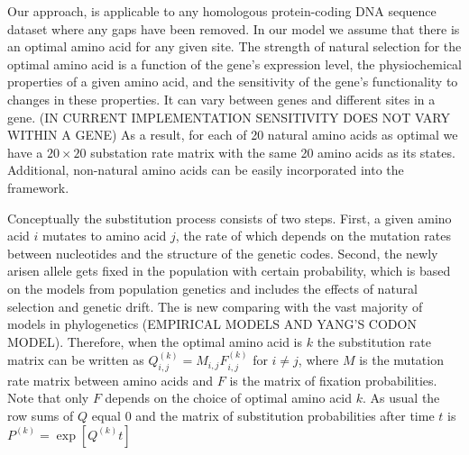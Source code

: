 \documentclass[13pt]{article}
\newcommand{\Qmat}{\ensuremath{\mathbf{Q}}\xspace}
\begin{document}
Our approach, is applicable to any homologous protein-coding DNA sequence dataset where any gaps have been removed.
In our model we assume that there is an optimal amino acid for any given site.
The strength of natural selection for the optimal amino acid is a function of the gene's expression level, the physiochemical properties of a given amino acid, and the sensitivity of the gene's functionality to changes in these properties.
It can vary between genes and different sites in a gene. (IN CURRENT IMPLEMENTATION SENSITIVITY DOES NOT VARY WITHIN A GENE)
As a result, for each of 20 natural amino acids as optimal we have a $20 \times 20$ substation rate matrix with the same 20 amino acids as its states. 
Additional, non-natural amino acids can be easily incorporated into the framework.


Conceptually the substitution process consists of two steps. 
First, a given amino acid $i$ mutates to amino acid $j$, the rate of which depends on the mutation rates between nucleotides and the structure of the genetic codes. 
Second, the newly arisen allele gets fixed in the population with certain probability, which is based on the models from population genetics and includes the effects of natural selection and genetic drift. 
The is new comparing with the vast majority of models in phylogenetics (EMPIRICAL MODELS AND YANG'S CODON MODEL).
Therefore, when the optimal amino acid is $k$ the substitution rate matrix can be written as $Q_{i,j}^{(k)}=M_{i,j}F_{i,j}^{(k)}$ for $i \ne j$, where $M$ is the mutation rate matrix between amino acids and $F$ is the matrix of fixation probabilities. 
Note that only $F$ depends on the choice of optimal amino acid $k$. 
As usual the row sums of $Q$ equal $0$ and the matrix of substitution probabilities after time $t$ is $P^{(k)} = \exp [Q^{(k)}t]$
\end{document}
